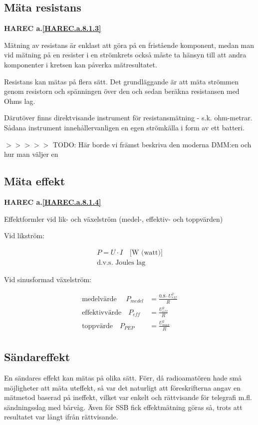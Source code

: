 \subsection{Mäta resistans}
\textbf{
HAREC a.\ref{HAREC.a.8.1.3}\label{myHAREC.a.8.1.3}
}

Mätning av resistans är enklast att göra på en fristående komponent,
medan man vid mätning på en resister i en strömkrets också måste ta
hänsyn till att andra komponenter i kretsen kan påverka mätresultatet.

Resistans kan mätas på flera sätt. Det grundläggande är att mäta
strömmen genom resistorn och spänningen över den och sedan beräkna
resistansen med Ohms lag.

Därutöver finns direktvisande instrument för resistansmätning -
s.k. ohm-metrar. Sådana instrument innehållervanligen en egen
strömkälla i form av ett batteri.

$>>>>>$ TODO: Här borde vi främst beskriva den moderna DMM:en och hur man väljer en

\subsection{Mäta effekt}
\textbf{
HAREC a.\ref{HAREC.a.8.1.4}\label{myHAREC.a.8.1.4}
}
\label{mätaeffekt}

Effektformler vid lik- och växelström (medel-, effektiv- och
toppvärden)

Vid likström:

\begin{gather*}
P = U \cdot I \quad \text{[W (watt)]} \\
\text{d.v.s. Joules lag}
\end{gather*}

Vid sinusformad växelström:

\begin{align*}
  \text{medelvärde   } \quad P_{medel} &= \frac{0.8\cdot U_{eff}^2}{R} \\
  \text{effektivvärde} \quad   P_{eff} &= \frac{U_{eff}^2}{R} \\
  \text{toppvärde}     \quad   P_{PEP} &= \frac{U_{max}^2}{R} \\
\end{align*}

\subsection{Sändareffekt}

En sändares effekt kan mätas på olika sätt.  Förr, då radioamatören
hade små möjligheter att mäta uteffekt, så var det naturligt att
föreskrifterna angav en mätmetod baserad på ineffekt, vilket var
enkelt och rättvisande för telegrafi m.fl. sändningsslag med bärvåg.
Även för SSB fick effektmätning göras så, trots att resultatet var
långt ifrån rättvisande.

